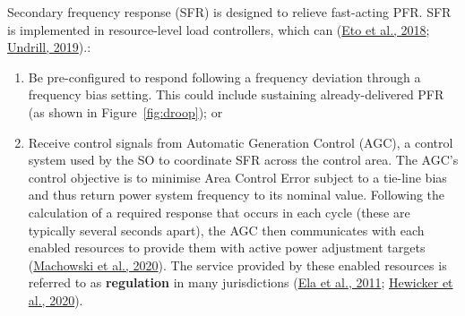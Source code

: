 \documentclass[12pt,a4paper,]{report}
\providecommand{\tightlist}{%
  \setlength{\itemsep}{0pt}\setlength{\parskip}{0pt}}
\begin{document}
Secondary frequency response (SFR) is designed to relieve fast-acting
PFR. SFR is implemented in resource-level load controllers, which can
(\protect\hyperlink{ref-etoFrequencyControlRequirements2018}{Eto et al.,
2018}; \protect\hyperlink{ref-undrillNotesFrequencyControl2019}{Undrill,
2019}).:

\begin{enumerate}
\def\labelenumi{\arabic{enumi}.}
\tightlist
\item
  Be pre-configured to respond following a frequency deviation through a
  frequency bias setting. This could include sustaining
  already-delivered PFR (as shown in Figure~\ref{fig:droop}); or
\item
  Receive control signals from Automatic Generation Control (AGC), a
  control system used by the SO to coordinate SFR across the control
  area. The AGC's control objective is to minimise Area Control Error
  subject to a tie-line bias and thus return power system frequency to
  its nominal value. Following the calculation of a required response
  that occurs in each cycle (these are typically several seconds apart),
  the AGC then communicates with each enabled resources to provide them
  with active power adjustment targets
  (\protect\hyperlink{ref-machowskiPowerSystemDynamics2020}{Machowski et
  al., 2020}). The service provided by these enabled resources is
  referred to as \textbf{regulation} in many jurisdictions
  (\protect\hyperlink{ref-elaOperatingReservesVariable2011}{Ela et al.,
  2011};
  \protect\hyperlink{ref-hewickerDimensioningControlReserves2020}{Hewicker
  et al., 2020}).
\end{enumerate}
\end{document}
